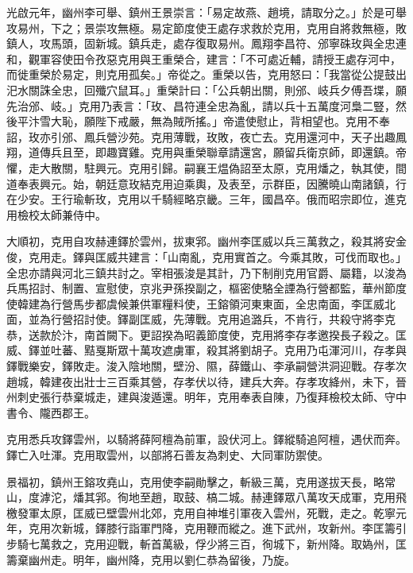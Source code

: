 \begin{pinyinscope}
 光啟元年，幽州李可舉、鎮州王景崇言：「易定故燕、趙境，請取分之。」於是可舉攻易州，下之；景崇攻無極。易定節度使王處存求救於克用，克用自將救無極，敗鎮人，攻馬頭，固新城。鎮兵走，處存復取易州。鳳翔李昌符、邠寧硃玫與全忠連和，觀軍容使田令孜惡克用與王重榮合，建言：「不可處近輔，請授王處存河中，而徙重榮於易定，則克用孤矣。」帝從之。重榮以告，克用怒曰：「我當從公提鼓出汜水關誅全忠，回殲穴鼠耳。」重榮計曰：「公兵朝出關，則邠、岐兵夕傅吾堞，願先治邠、岐。」克用乃表言：「玫、昌符連全忠為亂，請以兵十五萬度河梟二豎，然後平汴雪大恥，願陛下戒嚴，無為賊所搖。」帝遣使慰止，背相望也。克用不奉詔，玫亦引邠、鳳兵營沙苑。克用薄戰，玫敗，夜亡去。克用還河中，天子出趣鳳翔，道傳兵且至，即趣寶雞。克用與重榮聯章請還宮，願留兵衛京師，即還鎮。帝懼，走大散關，駐興元。克用引歸。嗣襄王煴偽詔至太原，克用燔之，執其使，間道奉表興元。始，朝廷意玫結克用迫乘輿，及表至，示群臣，因騰曉山南諸鎮，行在少安。王行瑜斬玫，克用以千騎經略京畿。三年，國昌卒。俄而昭宗即位，進克用檢校太師兼侍中。



 大順初，克用自攻赫連鐸於雲州，拔東郛。幽州李匡威以兵三萬救之，殺其將安金俊，克用走。鐸與匡威共建言：「山南亂，克用實首之。今乘其敗，可伐而取也。」全忠亦請與河北三鎮共討之。宰相張浚是其計，乃下制削克用官爵、屬籍，以浚為兵馬招討、制置、宣慰使，京兆尹孫揆副之，樞密使駱全諲為行營都監，華州節度使韓建為行營馬步都虞候兼供軍糧料使，王鎔領河東東面，全忠南面，李匡威北面，並為行營招討使。鐸副匡威，先薄戰。克用追潞兵，不肯行，共殺守將李克恭，送款於汴，南首闕下。更詔揆為昭義節度使，克用將李存孝邀揆長子殺之。匡威、鐸並吐蕃、黠戛斯眾十萬攻遮虜軍，殺其將劉胡子。克用乃屯渾河川，存孝與鐸戰樂安，鐸敗走。浚入陰地關，壁汾、隰，薛鐵山、李承嗣營洪洞迎戰。存孝次趙城，韓建夜出壯士三百乘其營，存孝伏以待，建兵大奔。存孝攻絳州，未下，晉州刺史張行恭棄城走，建與浚遁還。明年，克用奉表自陳，乃復拜檢校太師、守中書令、隴西郡王。



 克用悉兵攻鐸雲州，以騎將薛阿檀為前軍，設伏河上。鐸縱騎追阿檀，遇伏而奔。鐸亡入吐渾。克用取雲州，以部將石善友為刺史、大同軍防禦使。



 景福初，鎮州王鎔攻堯山，克用使李嗣勛擊之，斬級三萬，克用遂拔天長，略常山，度滹沱，燔其郛。徇地至趙，取鼓、槁二城。赫連鐸眾八萬攻天成軍，克用飛檄發軍太原，匡威已壁雲州北郊，克用自神堆引軍夜入雲州，死戰，走之。乾寧元年，克用次新城，鐸膝行詣軍門降，克用鞭而縱之。進下武州，攻新州。李匡籌引步騎七萬救之，克用迎戰，斬首萬級，俘少將三百，徇城下，新州降。取媯州，匡籌棄幽州走。明年，幽州降，克用以劉仁恭為留後，乃旋。




\end{pinyinscope}
